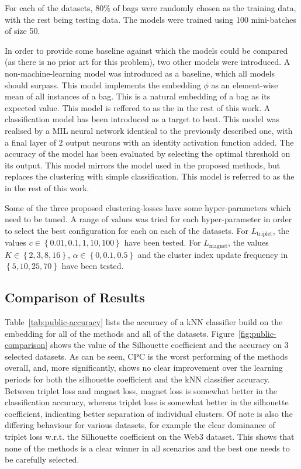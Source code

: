 For each of the datasets, 80\% of bags were randomly chosen as the training data, with the rest being testing data. The models were trained using 100 mini-batches of size 50.

In order to provide some baseline against which the models could be compared (as there is no prior art for this problem), two other models were introduced. A non-machine-learning model was introduced as a baseline, which all models should surpass. This model implements the embedding \( \phi \) as an element-wise mean of all instances of a bag. This is a natural embedding of a bag as its expected value. This model is reffered to as the  in the rest of this work. A classification model has been introduced as a target to beat. This model was realised by a MIL neural network identical to the previously described one, with a final layer of 2 output neurons with an identity activation function added. The accuracy of the model has been evaluated by selecting the optimal threshold on its output. This model mirrors the model used in the proposed methods, but replaces the clustering with simple classification. This model is referred to as the  in the rest of this work.

Some of the three proposed clustering-losses have some hyper-parameters which need to be tuned. A range of values was tried for each hyper-parameter in order to select the best configuration for each on each of the datasets. For \( L_\mathrm{triplet} \), the values \( c \in \left\{ 0.01, 0.1, 1, 10, 100 \right\} \) have been tested. For \( L_\mathrm{magnet} \), the values \( K \in \left\{ 2, 3, 8, 16 \right\} \), \( \alpha \in \left\{ 0, 0.1, 0.5 \right\} \) and the cluster index update frequency in \( \left\{ 5, 10, 25, 70 \right\} \) have been tested.

\subsection{Comparison of Results}\label{sec:experiment-comparison}

Table~\ref{tab:public-accuracy} lists the accuracy of a kNN classifier build on the embedding for all of the methods and all of the datasets. Figure~\ref{fig:public-comparison} shows the value of the Silhouette coefficient and the accuracy on 3 selected datasets. As can be seen, CPC is the worst performing of the methods overall, and, more significantly, shows no clear improvement over the learning periods for both the silhouette coefficient and the kNN classifier accuracy. Between triplet loss and magnet loss, magnet loss is somewhat better in the classification accuracy, whereas triplet loss is somewhat better in the silhouette coefficient, indicating better separation of individual clusters. Of note is also the differing behaviour for various datasets, for example the clear dominance of triplet loss w.r.t. the Silhouette coefficient on the Web3 dataset. This shows that none of the methods is a clear winner in all scenarios and the best one needs to be carefully selected.

